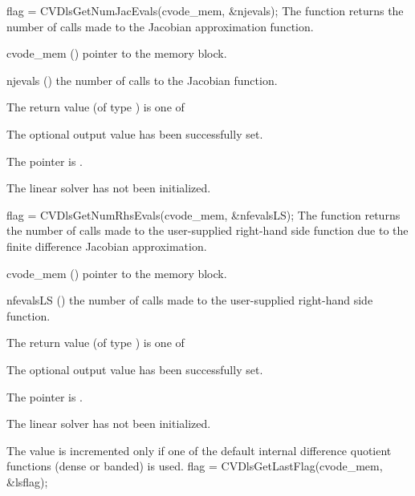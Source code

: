 {
  flag = CVDlsGetNumJacEvals(cvode\_mem, \&njevals);
}
{
  The function  returns the
  number of calls made to the {\cvdls} Jacobian approximation
  function.
}
{
  \begin{args}
  \item[cvode\_mem] ()
    pointer to the {\cvode} memory block.
  \item[njevals] ()
    the number of calls to the Jacobian function.
  \end{args}
}
{
  The return value  (of type ) is one of
  \begin{args}
  \item[\Id{CVDLS\_SUCCESS}]
    The optional output value has been successfully set.
  \item[\Id{CVDLS\_MEM\_NULL}]
    The  pointer is .
  \item[\Id{CVDLS\_LMEM\_NULL}]
    The {\cvdls} linear solver has not been initialized.
  \end{args}
}
{}
{
  flag = CVDlsGetNumRhsEvals(cvode\_mem, \&nfevalsLS);
}
{
  The function  returns the
  number of calls made to the user-supplied right-hand side function
  due to the finite difference Jacobian approximation.
}
{
  \begin{args}
  \item[cvode\_mem] ()
    pointer to the {\cvode} memory block.
  \item[nfevalsLS] ()
    the number of calls made to the user-supplied right-hand side function.
  \end{args}
}
{
  The return value  (of type ) is one of
  \begin{args}
  \item[\Id{CVDLS\_SUCCESS}]
    The optional output value has been successfully set.
  \item[\Id{CVDLS\_MEM\_NULL}]
    The  pointer is .
  \item[\Id{CVDLS\_LMEM\_NULL}]
    The {\cvdls} linear solver has not been initialized.
  \end{args}
}
{
  The value  is incremented only if one of the default
  internal difference quotient functions (dense or banded) is
  used.
}
{
  flag = CVDlsGetLastFlag(cvode\_mem, \&lsflag);
}
